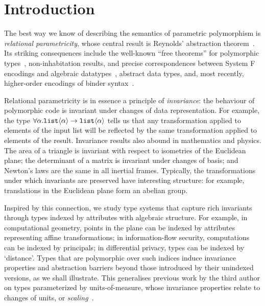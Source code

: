 \section{Introduction}
\label{sec:introduction}
The best way we know of describing the semantics of parametric
polymorphism is \emph{relational parametricity}, whose central result
is Reynolds' abstraction theorem~\cite{reynolds83types}. Its striking
consequences include the well-known ``free theorems'' for polymorphic
types~\cite{wadler89theorems}, non-inhabitation results, and precise
correspondences between System F encodings and algebraic
datatypes~\cite{PittsAM:parpoe}, abstract data types, and, most
recently, higher-order encodings of binder
syntax~\cite{syntaxforfree}.

Relational parametricity is in essence a principle of
\emph{invariance}: the behaviour of polymorphic code is invariant
under changes of data representation. For example, the type
$\forall\alpha.\textup{\texttt{list}}\langle \alpha \rangle\to\textup{\texttt{list}}\langle \alpha \rangle$
tells us that any transformation applied to elements of
the input list will be reflected by the same transformation applied
to elements of the result. 
Invariance results also abound in
mathematics and physics. The area of a triangle is invariant with
respect to isometries of the Euclidean plane; the determinant of a
matrix is invariant under changes of basis; and Newton's laws are the
same in all inertial frames. Typically, the 
transformations under which invariants are preserved have interesting structure: 
for example, translations in
the Euclidean plane form an abelian group.

Inspired by this connection, we study type systems that
capture rich invariants through types indexed by attributes with
algebraic structure.  For example, in computational geometry, points
in the plane can be indexed by attributes representing affine
transformations; in information-flow security, computations can be
indexed by principals; in differential privacy, types can be indexed
by `distance'. Types that are polymorphic over such indices induce
invariance properties and abstraction barriers beyond those introduced
by their unindexed versions, as we shall illustrate.  This generalises
previous work by the third author on types parameterized by
units-of-measure, whose invariance properties relate to changes of
units, or \emph{scaling}~\cite{kennedy97relational}.

